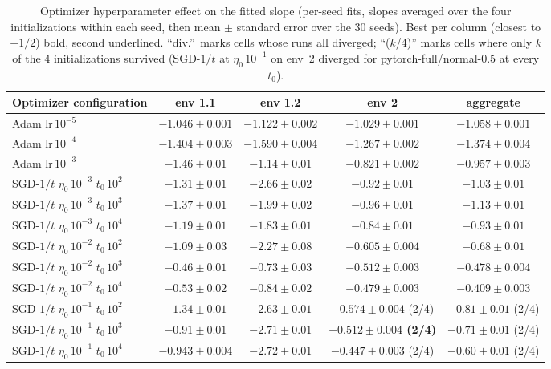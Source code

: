 \begin{table}[H]
\centering
\footnotesize
\setlength{\tabcolsep}{3pt}
\renewcommand{\arraystretch}{1.06}
\begin{tabular}{@{}>{\raggedright\arraybackslash}p{3.6cm} cccc@{}}
\toprule
\textbf{Optimizer configuration} & \textbf{env 1.1} & \textbf{env 1.2} & \textbf{env 2} & \textbf{aggregate} \\
\midrule
Adam $\mathrm{lr}\,10^{-5}$ & $-1.046 \pm 0.001$ & $-1.122 \pm 0.002$ & $-1.029 \pm 0.001$ & $-1.058 \pm 0.001$ \\
Adam $\mathrm{lr}\,10^{-4}$ & $-1.404 \pm 0.003$ & $-1.590 \pm 0.004$ & $-1.267 \pm 0.002$ & $-1.374 \pm 0.004$ \\
Adam $\mathrm{lr}\,10^{-3}$ & $-1.46 \pm 0.01$ & $-1.14 \pm 0.01$ & $-0.821 \pm 0.002$ & $-0.957 \pm 0.003$ \\
SGD-$1/t$ $\eta_0\,10^{-3}$ $t_0\,10^{2}$ & $-1.31 \pm 0.01$ & $-2.66 \pm 0.02$ & $-0.92 \pm 0.01$ & $-1.03 \pm 0.01$ \\
SGD-$1/t$ $\eta_0\,10^{-3}$ $t_0\,10^{3}$ & $-1.37 \pm 0.01$ & $-1.99 \pm 0.02$ & $-0.96 \pm 0.01$ & $-1.13 \pm 0.01$ \\
SGD-$1/t$ $\eta_0\,10^{-3}$ $t_0\,10^{4}$ & $-1.19 \pm 0.01$ & $-1.83 \pm 0.01$ & $-0.84 \pm 0.01$ & $-0.93 \pm 0.01$ \\
SGD-$1/t$ $\eta_0\,10^{-2}$ $t_0\,10^{2}$ & $-1.09 \pm 0.03$ & $-2.27 \pm 0.08$ & $-0.605 \pm 0.004$ & $-0.68 \pm 0.01$ \\
SGD-$1/t$ $\eta_0\,10^{-2}$ $t_0\,10^{3}$ & \underline{$-0.46 \pm 0.01$} & \textbf{$-0.73 \pm 0.03$} & \underline{$-0.512 \pm 0.003$} & \textbf{$-0.478 \pm 0.004$} \\
SGD-$1/t$ $\eta_0\,10^{-2}$ $t_0\,10^{4}$ & \textbf{$-0.53 \pm 0.02$} & \underline{$-0.84 \pm 0.02$} & $-0.479 \pm 0.003$ & \underline{$-0.409 \pm 0.003$} \\
SGD-$1/t$ $\eta_0\,10^{-1}$ $t_0\,10^{2}$ & $-1.34 \pm 0.01$ & $-2.63 \pm 0.01$ & $-0.574 \pm 0.004$ {\scriptsize(2/4)} & $-0.81 \pm 0.01$ {\scriptsize(2/4)} \\
SGD-$1/t$ $\eta_0\,10^{-1}$ $t_0\,10^{3}$ & $-0.91 \pm 0.01$ & $-2.71 \pm 0.01$ & \textbf{$-0.512 \pm 0.004$ {\scriptsize(2/4)}} & $-0.71 \pm 0.01$ {\scriptsize(2/4)} \\
SGD-$1/t$ $\eta_0\,10^{-1}$ $t_0\,10^{4}$ & $-0.943 \pm 0.004$ & $-2.72 \pm 0.01$ & $-0.447 \pm 0.003$ {\scriptsize(2/4)} & $-0.60 \pm 0.01$ {\scriptsize(2/4)} \\
\bottomrule
\end{tabular}
\caption{Optimizer hyperparameter effect on the fitted slope (per-seed fits, slopes averaged over the four initializations within each seed, then mean $\pm$ standard error over the 30 seeds). Best per column (closest to $-1/2$) bold, second underlined. ``div.''\ marks cells whose runs all diverged; ``($k$/4)'' marks cells where only $k$ of the 4 initializations survived (SGD-$1/t$ at $\eta_0\,10^{-1}$ on env~2 diverged for pytorch-full/normal-0.5 at every $t_0$).}
\label{tab:convergence-run1-opt-effect}
\end{table}
